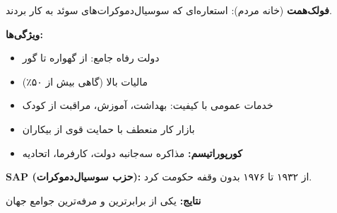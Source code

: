 \begin{historybox}
\textbf{فولک‌همت} (خانه مردم): استعاره‌ای که سوسیال‌دموکرات‌های سوئد به کار بردند.

\textbf{ویژگی‌ها:}
\begin{itemize}[nosep]
    \item دولت رفاه جامع: از گهواره تا گور
    \item مالیات بالا (گاهی بیش از ۵۰٪)
    \item خدمات عمومی با کیفیت: بهداشت، آموزش، مراقبت از کودک
    \item بازار کار منعطف با حمایت قوی از بیکاران
    \item \textbf{کورپوراتیسم:} مذاکره سه‌جانبه دولت، کارفرما، اتحادیه
\end{itemize}

\textbf{SAP (حزب سوسیال‌دموکرات):} از ۱۹۳۲ تا ۱۹۷۶ بدون وقفه حکومت کرد.

\textbf{نتایج:} یکی از برابرترین و مرفه‌ترین جوامع جهان
\end{historybox}

